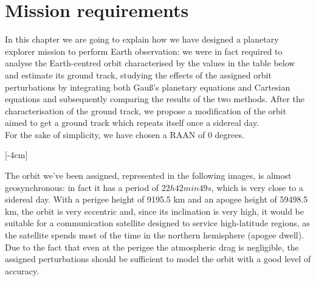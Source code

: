 \documentclass[11pt,a4paper]{report}
\begin{document}
\chapter{Mission requirements}
In this chapter we are going to explain how we have designed a planetary explorer
mission to perform Earth observation: we were in fact required to analyse the Earth-centred orbit characterised by the values in the table below and estimate its ground track, studying the effects of the assigned orbit perturbations by integrating both Gauß’s planetary equations and Cartesian equations and subsequently comparing the results of the two methods. After the characterisation of the ground track, we propose a modification of the orbit aimed to get a ground track which repeats itself once a sidereal day.\\
For the sake of simplicity, we have chosen a RAAN of 0 degrees.

\begin{table}[H]
\centering
{}
\caption{Mission requirements}
\label{tab:Mission_requirements}
\end{table}

[-4cm]

The orbit we've been assigned, represented in the following images, is almost geosynchronous: in fact it has a period of $22h 42 min 49s$, which is very close to a sidereal day. With a perigee height of 9195.5 km and an apogee height of 59498.5 km, the orbit is very eccentric and, since its inclination is very high, it would be suitable for a communication satellite designed to service high-latitude regions, as the satellite spends most of the time in the northern hemisphere (apogee dwell).  
Due to the fact that even at the perigee the atmospheric drag is negligible, the assigned perturbations should be sufficient to model the orbit with a good level of accuracy.
\end{document}
